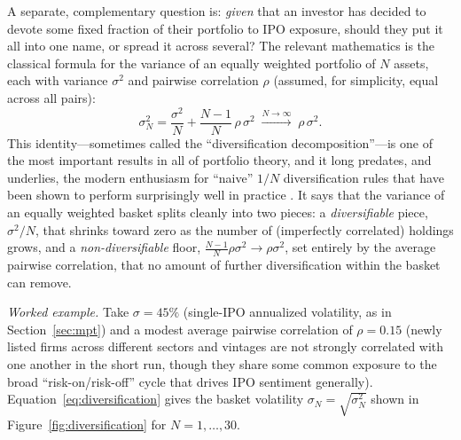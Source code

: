 \documentclass[conference]{IEEEtran}
\begin{document}
A separate, complementary question is: \emph{given} that an investor has decided to devote some fixed fraction of their portfolio to IPO exposure, should they put it all into one name, or spread it across several? The relevant mathematics is the classical formula for the variance of an equally weighted portfolio of $N$ assets, each with variance $\sigma^2$ and pairwise correlation $\rho$ (assumed, for simplicity, equal across all pairs):
\begin{equation}
\sigma_N^2 = \frac{\sigma^2}{N} + \frac{N-1}{N}\,\rho\,\sigma^2 \;\xrightarrow{N \to \infty}\; \rho\,\sigma^2.
\label{eq:diversification}
\end{equation}
This identity---sometimes called the ``diversification decomposition''---is one of the most important results in all of portfolio theory, and it long predates, and underlies, the modern enthusiasm for ``naive'' $1/N$ diversification rules that have been shown to perform surprisingly well in practice \cite{benartzithaler2001}. It says that the variance of an equally weighted basket splits cleanly into two pieces: a \emph{diversifiable} piece, $\sigma^2/N$, that shrinks toward zero as the number of (imperfectly correlated) holdings grows, and a \emph{non-diversifiable} floor, $\frac{N-1}{N}\rho\sigma^2 \to \rho\sigma^2$, set entirely by the average pairwise correlation, that no amount of further diversification within the basket can remove.

\noindent\textit{Worked example.} Take $\sigma = 45\%$ (single-IPO annualized volatility, as in Section~\ref{sec:mpt}) and a modest average pairwise correlation of $\rho = 0.15$ (newly listed firms across different sectors and vintages are not strongly correlated with one another in the short run, though they share some common exposure to the broad ``risk-on/risk-off'' cycle that drives IPO sentiment generally). Equation~\eqref{eq:diversification} gives the basket volatility $\sigma_N = \sqrt{\sigma_N^2}$ shown in Figure~\ref{fig:diversification} for $N = 1, \dots, 30$.
\end{document}
